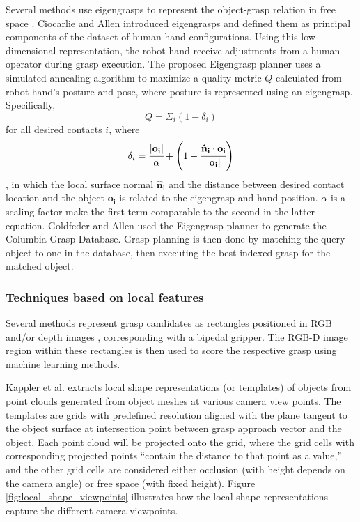 Several methods use eigengrasps to represent the object-grasp relation in free space \cite{Goldfeder2011,Ciocarlie2009}.
Ciocarlie and Allen \cite{Ciocarlie2009} introduced eigengrasps and defined them as principal components of the dataset
of human hand configurations. Using this low-dimensional representation, the robot hand receive adjustments from a human
operator during grasp execution. The proposed Eigengrasp planner uses a simulated annealing algorithm to maximize a
quality metric $Q$ calculated from robot hand's posture and pose, where posture is represented using an eigengrasp.
Specifically,
\[ Q = \Sigma_i (1 - \delta_i) \]
for all desired contacts $i$, where
\[
\delta_i = \cfrac{|\mathbf{o_i}|}{\alpha}
+ \left(1 - \cfrac{\mathbf{\hat{n}_i} \cdot \mathbf{o_i}}{|\mathbf{o_i}|} \right)
\]
, in which the local surface normal $\mathbf{\hat{n}_i}$ and the distance between desired contact location and the
object $\mathbf{o_i}$ is related to the eigengrasp and hand position. $\alpha$ is a scaling factor make the first term
comparable to the second in the latter equation. Goldfeder and Allen \cite{Goldfeder2011} used the Eigengrasp planner
to generate the Columbia Grasp Database. Grasp planning is then done by matching the query object to one in the
database, then executing the best indexed grasp for the matched object.


\subsubsection*{Techniques based on local features} \label{subsub:object_grasp_local}

Several methods represent grasp candidates as rectangles positioned in RGB and/or depth images \cite{lenz2015,jiang2011},
corresponding with a bipedal gripper. The RGB-D image region within these rectangles is then used to score the
respective grasp using machine learning methods.

Kappler et al. \cite{Kappler2015} extracts local shape representations (or templates) of objects from point clouds
generated from object meshes at various camera view points. The templates are grids with predefined resolution
aligned with the plane tangent to the object surface at intersection point between grasp approach vector and the
object. Each point cloud will be projected onto the grid, where the grid cells with corresponding projected points
``contain the distance to that point as a value,'' and the other grid cells are considered either occlusion
(with height depends on the camera angle) or free space (with fixed height). Figure \ref{fig:local_shape_viewpoints}
illustrates how the local shape representations capture the different camera viewpoints.

